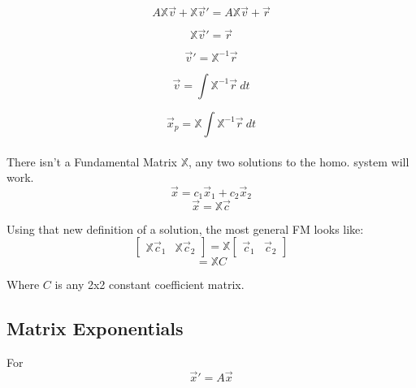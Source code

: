 \documentclass[12pt]{article}
\numberwithin{equation}{subsection}
\newcommand{\indb}{\hspace{1cm}}
\begin{document}
\begin{equation}
A\mathbb{X}\vec{v} + \mathbb{X}\vec{v}' =A\mathbb{X}\vec{v}+\vec{r}
\end{equation}

\begin{equation}
\mathbb{X}\vec{v}' = \vec{r}
\end{equation}

\begin{equation}
\vec{v}' =\mathbb{X}^{-1} \vec{r}
\end{equation}

\begin{equation}
\vec{v} =\int \mathbb{X}^{-1} \vec{r}\ dt
\end{equation}

\begin{equation}
\vec{x}_p =\mathbb{X} \int \mathbb{X}^{-1} \vec{r}\ dt
\end{equation}\\

There isn't a Fundamental Matrix $\mathbb{X}$, any two solutions to the homo. system will work.
\begin{equation}
\vec{x}=c_1\vec{x}_1+c_2\vec{x}_2
\end{equation}
\begin{equation}
\vec{x}=\mathbb{X}\vec{c}
\end{equation}

Using that new definition of a solution, the most general FM looks like:
\begin{equation}
\begin{bmatrix}
\mathbb{X}\vec{c}_1 & \mathbb{X}\vec{c}_2
\end{bmatrix}=\mathbb{X}\begin{bmatrix}
\vec{c}_1 & \vec{c}_2
\end{bmatrix}
\end{equation}
\begin{equation}
=\mathbb{X}C
\end{equation}

\indb Where $C$ is any 2x2 constant coefficient matrix.


\newpage
\subsection{Matrix Exponentials} 

For \begin{equation}
\vec{x}'=A\vec{x}
\end{equation}
\end{document}
